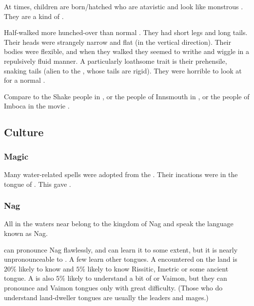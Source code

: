 At times, children are born/hatched who are atavistic and look like monstrous \nagae. 
They are a kind of . 

Half-\nagae walked more hunched-over than normal \scathae.
They had short legs and long tails. 
Their heads were strangely narrow and flat (in the vertical direction). 
Their bodies were flexible, and when they walked they seemed to writhe and wiggle in a repulsively fluid manner.
A particularly loathsome trait is their prehensile, snaking tails (alien to the \scathae, whose tails are rigid).
They were horrible to look at for a normal \scatha.

Compare to the Shake people in \cite[pp.360--361]{StevenErikson:ReapersGale}, or the people of Innsmouth in , or the people of Imboca in the movie . 









\subsection{Culture}






\subsubsection{Magic}
Many water-related spells were adopted from the \nagae.
Their incations were in the tongue of .
This gave \VizicarDurasRespina {}.






\subsubsection{Nag}
All \nagae{} in the waters near \Azmith{} belong to the kingdom of Nag and speak the language known as Nag. 

\Dragons{} can pronounce Nag flawlessly, and \scathae{} can learn it to some extent, but it is nearly unpronounceable to \humans{}. 
A few \nagae{} learn other tongues. 
A \naga{} encountered on the land is $20\%$ likely to know \CommonDraconic and $5\%$ likely to know Rissitic, Imetric or some ancient \scathaese{} tongue. 
A \naga{} is also $5\%$ likely to understand a bit of \Velcadian{} or Vaimon, but they can pronounce \human{} and Vaimon tongues only with great difficulty. 
(Those \nagae{} who do understand land-dweller tongues are usually the leaders and mages.) 






